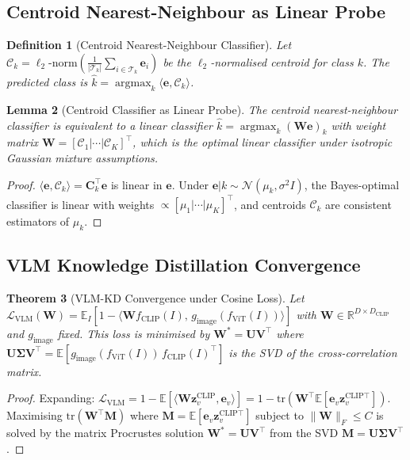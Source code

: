 \documentclass[10pt,conference]{IEEEtran}
\theoremstyle{ieeethm}
\newtheorem{theorem}{Theorem}
\newtheorem{lemma}[theorem]{Lemma}
\theoremstyle{ieeedef}
\newtheorem{definition}[theorem]{Definition}
\theoremstyle{ieeeremark}
\begin{document}
\subsection{Centroid Nearest-Neighbour as Linear Probe}

\begin{definition}[Centroid Nearest-Neighbour Classifier]
\label{def:centroid}
Let $\mathcal{C}_k = \ell_2\text{-norm}\!\left(\frac{1}{|\mathcal{T}_k|}\sum_{i \in \mathcal{T}_k}\mathbf{e}_i\right)$ be the $\ell_2$-normalised centroid for class $k$. The predicted class is $\hat{k} = \operatorname{argmax}_{k} \langle \mathbf{e}, \mathcal{C}_k \rangle$.
\end{definition}

\begin{lemma}[Centroid Classifier as Linear Probe]
\label{lem:centroid_linear}
The centroid nearest-neighbour classifier is equivalent to a linear classifier $\hat{k} = \operatorname{argmax}_k (\mathbf{W}\mathbf{e})_k$ with weight matrix $\mathbf{W} = [\mathcal{C}_1 | \cdots | \mathcal{C}_K]^\top$, which is the optimal linear classifier under isotropic Gaussian mixture assumptions.
\end{lemma}
\begin{proof}
$\langle\mathbf{e}, \mathcal{C}_k\rangle = \mathbf{C}_k^\top\mathbf{e}$ is linear in $\mathbf{e}$. Under $\mathbf{e}|k \sim \mathcal{N}(\mu_k, \sigma^2 I)$, the Bayes-optimal classifier is linear with weights $\propto [\mu_1|\cdots|\mu_K]^\top$, and centroids $\mathcal{C}_k$ are consistent estimators of $\mu_k$.
\end{proof}

\subsection{VLM Knowledge Distillation Convergence}

\begin{theorem}[VLM-KD Convergence under Cosine Loss]
\label{thm:vlm_convergence}
Let $\mathcal{L}_\text{VLM}(\mathbf{W}) = \mathbb{E}_{I}[1 - \langle \mathbf{W} f_\text{CLIP}(I),\, g_\text{image}(f_\text{ViT}(I))\rangle]$ with $\mathbf{W} \in \mathbb{R}^{D \times D_\text{CLIP}}$ and $g_\text{image}$ fixed. This loss is minimised by $\mathbf{W}^* = \mathbf{U}\mathbf{V}^\top$ where $\mathbf{U}\mathbf{\Sigma}\mathbf{V}^\top = \mathbb{E}[g_\text{image}(f_\text{ViT}(I))\, f_\text{CLIP}(I)^\top]$ is the SVD of the cross-correlation matrix.
\end{theorem}
\begin{proof}
Expanding: $\mathcal{L}_\text{VLM} = 1 - \mathbb{E}[\langle \mathbf{W}\mathbf{z}_v^\text{CLIP}, \mathbf{e}_v\rangle] = 1 - \text{tr}(\mathbf{W}^\top \mathbb{E}[\mathbf{e}_v \mathbf{z}_v^{\text{CLIP}\top}])$. Maximising $\text{tr}(\mathbf{W}^\top \mathbf{M})$ where $\mathbf{M} = \mathbb{E}[\mathbf{e}_v \mathbf{z}_v^{\text{CLIP}\top}]$ subject to $\|\mathbf{W}\|_F \leq C$ is solved by the matrix Procrustes solution $\mathbf{W}^* = \mathbf{U}\mathbf{V}^\top$ from the SVD $\mathbf{M} = \mathbf{U}\mathbf{\Sigma}\mathbf{V}^\top$.
\end{proof}
\end{document}
